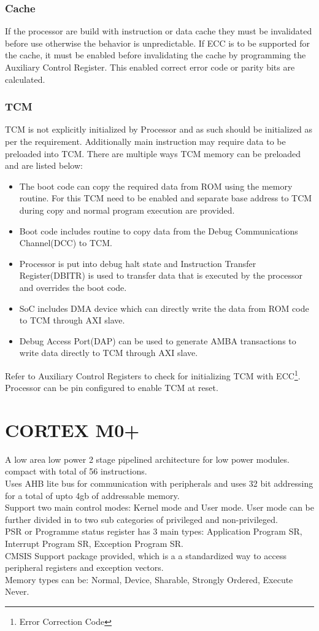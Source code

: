 \subsubsection{Cache}
If the processor are build with instruction or data cache they must be invalidated before use otherwise the behavior is unpredictable.
If ECC is to be supported for the cache, it must be enabled before invalidating the cache by programming the Auxiliary Control Register. This enabled correct error code or parity bits are calculated.

\subsubsection{TCM}
TCM is not explicitly initialized by Processor and as such should be initialized as per the requirement.
Additionally main instruction may require data to be preloaded into TCM. There are multiple ways TCM memory can be preloaded and are listed below:
\begin{itemize}
	\item The boot code can copy the required data from ROM using the memory routine. For this TCM need to be enabled and separate base address to TCM during copy and normal program execution are provided.
	\item Boot code includes routine to copy data from the Debug Communications Channel(DCC) to TCM.
	\item Processor is put into debug halt state and Instruction Transfer Register(DBITR) is used to transfer data that is executed by the processor and overrides the boot code.
	\item SoC includes DMA device which can directly write the data from ROM code to TCM through AXI slave.
	\item Debug Access Port(DAP) can be used to generate AMBA transactions to write data directly to TCM through AXI slave.
\end{itemize}
Refer to Auxiliary Control Registers to check for initializing TCM with ECC\footnote{Error Correction Code}.
Processor can be pin configured to enable TCM at reset.
\section{CORTEX M0+}
A low area low power 2 stage pipelined architecture for low power modules.\\
compact with total of 56 instructions.\\
Uses AHB lite bus for communication with peripherals and uses 32 bit addressing for a total of upto 4gb of addressable memory.\\
Support two main control modes: Kernel mode and User mode.
User mode can be further divided in to two sub categories of privileged and non-privileged.\\
PSR or Programme status register has 3 main types: Application Program SR, Interrupt Program SR, Exception Program SR.\\
CMSIS Support package provided, which is a a standardized way to access peripheral registers and exception vectors.\\
Memory types can be: Normal, Device, Sharable, Strongly Ordered, Execute Never.\\

